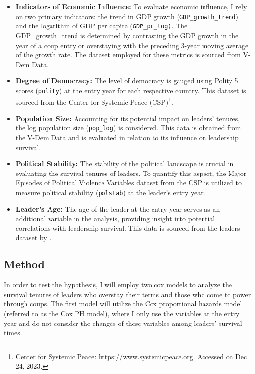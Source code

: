 \documentclass[
  12pt,
  a4paper,
  12pt]{article}
\begin{document}
\begin{itemize}
\item
  \textbf{Indicators of Economic Influence:} To evaluate economic
  influence, I rely on two primary indicators: the trend in GDP growth
  (\texttt{GDP\_growth\_trend}) and the logarithm of GDP per capita
  (\texttt{GDP\_pc\_log)}. The GDP\_growth\_trend is determined by
  contrasting the GDP growth in the year of a coup entry or overstaying
  with the preceding 3-year moving average of the growth rate. The
  dataset employed for these metrics is sourced from V-Dem Data.
\item
  \textbf{Degree of Democracy:} The level of democracy is gauged using
  Polity 5 scores (\texttt{polity}) at the entry year for each
  respective country. This dataset is sourced from the Center for
  Systemic Peace (CSP)\footnote{Center for Systemic Peace:
    \url{https://www.systemicpeace.org}. Accessed on Dec 24, 2023.}.
\item
  \textbf{Population Size:} Accounting for its potential impact on
  leaders' tenures, the log population size (\texttt{pop\_log}) is
  considered. This data is obtained from the V-Dem Data and is evaluated
  in relation to its influence on leadership survival.
\item
  \textbf{Political Stability:} The stability of the political landscape
  is crucial in evaluating the survival tenures of leaders. To quantify
  this aspect, the Major Episodes of Political Violence Variables
  dataset from the CSP is utilized to measure political stability
  (\texttt{polstab}) at the leader's entry year.
\item
  \textbf{Leader's Age:} The age of the leader at the entry year serves
  as an additional variable in the analysis, providing insight into
  potential correlations with leadership survival. This data is sourced
  from the leaders dataset by \citep{goemans2009}.
\end{itemize}

\subsection{Method}\label{method}

In order to test the hypothesis, I will employ two cox models to analyze
the survival tenures of leaders who overstay their terms and those who
come to power through coups. The first model will utilize the Cox
proportional hazards model (referred to as the Cox PH model), where I
only use the variables at the entry year and do not consider the changes
of these variables among leaders' survival times.
\end{document}
